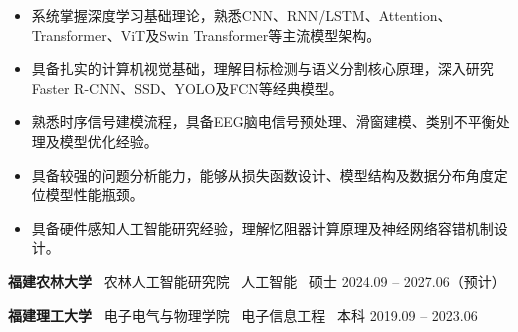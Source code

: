 \documentclass[zh]{resume}
\newcommand{\EduItem}[5]{%
  \noindent\textbf{#1} \textbullet\ #2 \textbullet\ #3 \textbullet\ #4
  \hfill #5\par
}
\begin{document}
\makeheader

\begin{abstract}
福建农林大学人工智能专业硕士研究生在读，预计2027年6月毕业。研究方向涵盖深度学习、计算机视觉、时序信号分析及硬件感知人工智能。系统学习并实践了CNN、LSTM、Transformer、Vision Transformer及Swin Transformer等主流深度学习架构，具备从网络结构设计、张量流动分析到模型训练优化的完整理解能力。

科研方面，以第一作者开展基于忆阻器的仿生自修复神经网络研究，针对永久故障场景提出基于Gradient Mask的容错训练机制，在30\%器件故障率下恢复90\%以上模型性能；同时负责基于忆阻器的CHB-MIT数据集的癫痫发作预测研究，实现95.6\%的F1 Score。具备独立完成数据处理、模型设计、实验分析及性能优化的能力。
\end{abstract}

\begin{itemize}
    \item 系统掌握深度学习基础理论，熟悉CNN、RNN/LSTM、Attention、Transformer、ViT及Swin Transformer等主流模型架构。
    \item 具备扎实的计算机视觉基础，理解目标检测与语义分割核心原理，深入研究Faster R-CNN、SSD、YOLO及FCN等经典模型。
    \item 熟悉时序信号建模流程，具备EEG脑电信号预处理、滑窗建模、类别不平衡处理及模型优化经验。
    \item 具备较强的问题分析能力，能够从损失函数设计、模型结构及数据分布角度定位模型性能瓶颈。
    \item 具备硬件感知人工智能研究经验，理解忆阻器计算原理及神经网络容错机制设计。
\end{itemize}

\begingroup
\small
\EduItem{福建农林大学}{农林人工智能研究院}{人工智能}{硕士}{2024.09 -- 2027.06（预计）}
\EduItem{福建理工大学}{电子电气与物理学院}{电子信息工程}{本科}{2019.09 -- 2023.06}
\endgroup
\end{document}
